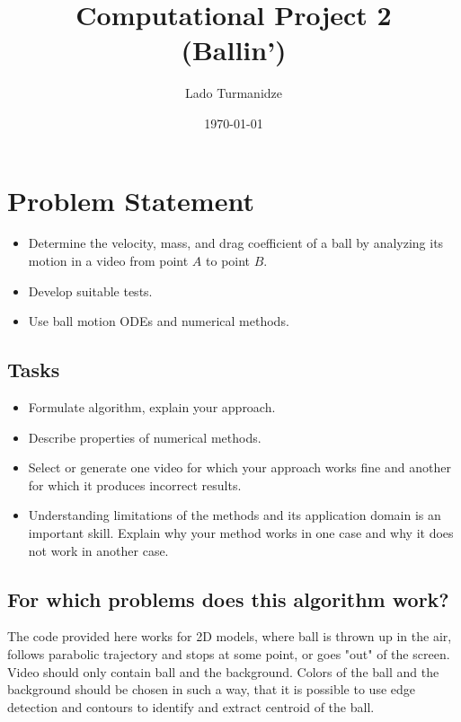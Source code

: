 \documentclass{article}
\begin{document}
	\title{\textcolor{bluish}{Computational Project 2 \\ (Ballin')}}
	\author{\textcolor{purplish}{Lado Turmanidze}}
	\date{\textcolor{purplish}{\today}}
	
	\maketitle
	
	\section{Problem Statement}
	
	\begin{itemize}
		\item[\ding{100}] Determine the velocity, mass, and drag coefficient of a ball by analyzing its motion in a video from point $A$ to point $B$.
		\item[\ding{100}] Develop suitable tests.
		\item[\ding{100}] Use ball motion ODEs and numerical methods.
	\end{itemize}

	\subsection{Tasks}
	\begin{itemize}
		\item[\ding{168}] Formulate algorithm, explain your approach.
		\item[\ding{169}] Describe properties of numerical methods.
		\item[\ding{170}] Select or generate one video for which your approach works fine and another for which it produces incorrect results.
		\item[\ding{171}] Understanding limitations of the methods and its application domain is an important skill. Explain why your method works in one case and why it does not work in another case.
	\end{itemize}

	\subsection{For which problems does this algorithm work?}
	\label{section:description}
	The code provided here works for 2D models, where ball is thrown up in the air, follows parabolic trajectory and stops at some point, or goes "out" of the screen. Video should only contain ball and the background. Colors of the ball and the background should be chosen in such a way, that it is possible to use edge detection and contours to identify and extract centroid of the ball.
\end{document}
